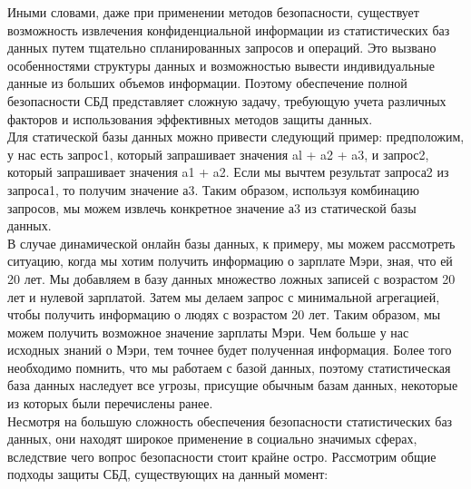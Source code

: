 Иными словами, даже при применении методов безопасности, существует возможность извлечения конфиденциальной информации из статистических баз данных путем тщательно спланированных запросов и операций. Это вызвано особенностями структуры данных и возможностью вывести индивидуальные данные из больших объемов информации. Поэтому обеспечение полной безопасности СБД представляет сложную задачу, требующую учета различных факторов и использования эффективных методов защиты данных.
\\

Для статической базы данных можно привести следующий пример: предположим, у нас есть запрос1, который запрашивает значения al + a2 + a3, и запрос2, который запрашивает значения a1 + a2. Если мы вычтем результат запроса2 из запроса1, то получим значение а3. Таким образом, используя комбинацию запросов, мы можем извлечь конкретное значение а3 из статической базы данных.
\\

В случае динамической онлайн базы данных, к примеру, мы можем рассмотреть ситуацию, когда мы хотим получить информацию о зарплате Мэри, зная, что ей 20 лет. Мы добавляем в базу данных множество ложных записей с возрастом 20 лет и нулевой зарплатой. Затем мы делаем запрос с минимальной агрегацией, чтобы получить информацию о людях с возрастом 20 лет. Таким образом, мы можем получить возможное значение зарплаты Мэри. Чем больше у нас исходных знаний о Мэри, тем точнее будет полученная информация. Более того необходимо помнить, что мы работаем с базой данных, поэтому статистическая база данных наследует все угрозы, присущие обычным базам данных, некоторые из которых были перечислены ранее.
\\

Несмотря на большую сложность обеспечения безопасности статистических баз данных, они находят широкое применение в социально значимых сферах, вследствие чего вопрос безопасности стоит крайне остро. Рассмотрим общие подходы защиты СБД, существующих на данный момент: 

